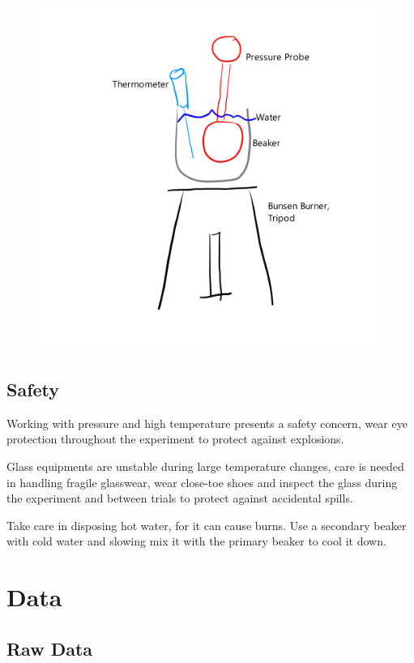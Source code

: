 \documentclass[a4paper,12pt]{article}
\begin{document}
\begin{figure}[H]
\begin{minipage}{.6\textwidth}
        \includegraphics[scale=0.55]{assets/setupdrawn.png}
        \label{fig:setupdrawn}
    \end{minipage}
\end{figure}

\subsection{Safety}
Working with pressure and high temperature presents a safety concern, wear eye protection throughout the experiment to protect against explosions.

Glass equipments are unstable during large temperature changes, care is needed in handling fragile glasswear, wear close-toe shoes and inspect the glass during the experiment and between trials to protect against accidental spills.

Take care in disposing hot water, for it can cause burns. Use a secondary beaker with cold water and slowing mix it with the primary beaker to cool it down.

\section{Data}
\subsection{Raw Data}
\end{document}
